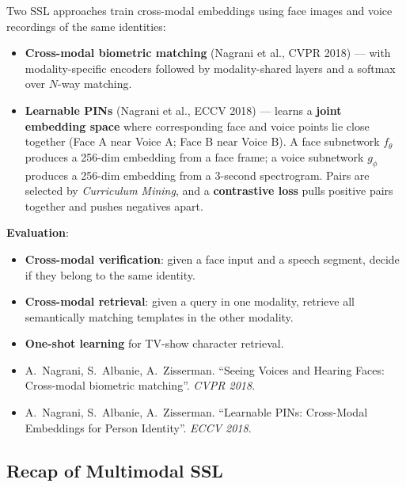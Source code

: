 \documentclass[11pt,a4paper]{article}
\theoremstyle{definition}
\theoremstyle{plain}
\theoremstyle{remark}
\begin{document}
Two SSL approaches train cross-modal embeddings using face images and voice recordings of the same identities:

\begin{itemize}
    \item \textbf{Cross-modal biometric matching} (Nagrani et al., CVPR 2018) --- with modality-specific encoders followed by modality-shared layers and a softmax over $N$-way matching.
    \item \textbf{Learnable PINs} (Nagrani et al., ECCV 2018) --- learns a \textbf{joint embedding space} where corresponding face and voice points lie close together (Face A near Voice A; Face B near Voice B). A face subnetwork $f_\theta$ produces a 256-dim embedding from a face frame; a voice subnetwork $g_\phi$ produces a 256-dim embedding from a 3-second spectrogram. Pairs are selected by \emph{Curriculum Mining}, and a \textbf{contrastive loss} pulls positive pairs together and pushes negatives apart.
\end{itemize}

\textbf{Evaluation}:
\begin{itemize}
    \item \textbf{Cross-modal verification}: given a face input and a speech segment, decide if they belong to the same identity.
    \item \textbf{Cross-modal retrieval}: given a query in one modality, retrieve all semantically matching templates in the other modality.
    \item \textbf{One-shot learning} for TV-show character retrieval.
\end{itemize}

\begin{tcolorbox}[colback=blue!5!white,colframe=blue!60!black,title={References}]
\begin{itemize}[leftmargin=*]
    \item A.\ Nagrani, S.\ Albanie, A.\ Zisserman. ``Seeing Voices and Hearing Faces: Cross-modal biometric matching''. \textit{CVPR 2018}.
    \item A.\ Nagrani, S.\ Albanie, A.\ Zisserman. ``Learnable PINs: Cross-Modal Embeddings for Person Identity''. \textit{ECCV 2018}.
\end{itemize}
\end{tcolorbox}

\subsection{Recap of Multimodal SSL}
\end{document}
